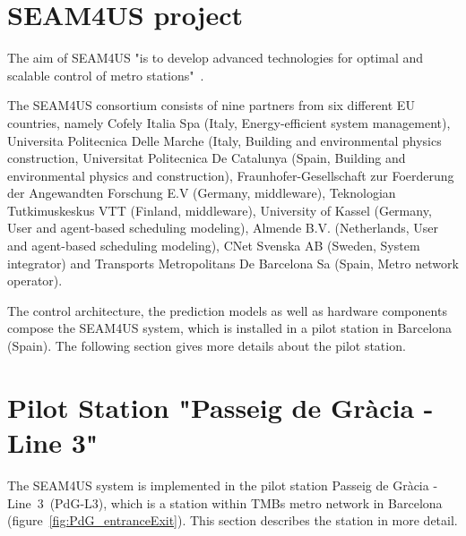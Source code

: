 
\section{SEAM4US project}
\label{sec:seam4us}
The aim of SEAM4US "is to develop advanced technologies for optimal and scalable control of metro stations"~\cite{SEAM4US_Website}.


The SEAM4US consortium consists of nine partners from six different EU countries, namely Cofely Italia Spa (Italy, Energy-efficient system management), Universita Politecnica Delle Marche (Italy, Building and environmental physics construction, Universitat Politecnica De Catalunya (Spain, Building and environmental physics and construction), Fraunhofer-Gesellschaft zur Foerderung der Angewandten Forschung E.V (Germany, middleware), Teknologian Tutkimuskeskus VTT (Finland, middleware), University of Kassel (Germany, User and agent-based scheduling modeling), Almende B.V. (Netherlands, User and agent-based scheduling modeling), CNet Svenska AB (Sweden, System integrator) and Transports Metropolitans De Barcelona Sa (Spain, Metro network operator).

The control architecture, the prediction models as well as hardware components compose the SEAM4US system, which is installed in a pilot station in Barcelona (Spain). The following section gives more details about the pilot station.


\section{Pilot Station "Passeig de Gr\`{a}cia - Line 3"}
\label{sec:station}

The SEAM4US system is implemented in the pilot station Passeig de Gr\`{a}cia - Line~3~(PdG-L3), which is a station within TMBs metro network in Barcelona (figure~\ref{fig:PdG_entranceExit}). 
This section describes the station in more detail.

